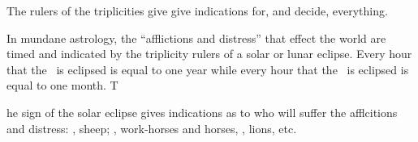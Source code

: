 The rulers of the triplicities give give indications for, and decide, everything.

In mundane astrology, the ``afflictions and distress'' that effect the world are timed and indicated by the triplicity rulers of a solar or lunar eclipse. Every hour that the \Sun\, is eclipsed is equal to one year while every hour that the \Moon\, is eclipsed is equal to one month. T

he sign of the solar eclipse gives indications as to who will suffer the afflcitions and distress: \Aries, sheep; \Sagittarius, work-horses and horses, \Leo, lions, etc.

\newpage